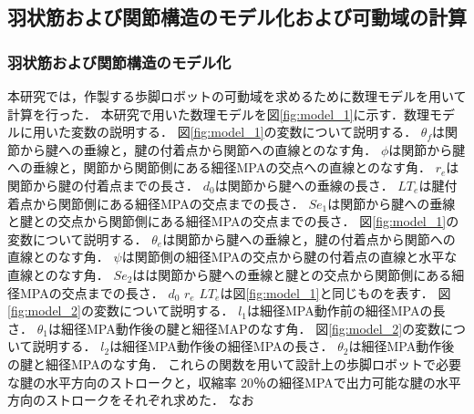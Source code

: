\subsection{羽状筋および関節構造のモデル化および可動域の計算}
\subsubsection{羽状筋および関節構造のモデル化}
本研究では，作製する歩脚ロボットの可動域を求めるために数理モデルを用いて計算を行った．
本研究で用いた数理モデルを図\ref{fig:model_1}に示す．数理モデルに用いた変数の説明する．
図\ref{fig:model_1}の変数について説明する．
$\theta_f $は関節から腱への垂線と，腱の付着点から関節への直線とのなす角．
$\phi $は関節から腱への垂線と，関節から関節側にある細径MPAの交点への直線とのなす角．
$r_e $は関節から腱の付着点までの長さ．
$d_0 $は関節から腱への垂線の長さ．
$LT_e $は腱付着点から関節側にある細径MPAの交点までの長さ．
$Se_1 $は関節から腱への垂線と腱との交点から関節側にある細径MPAの交点までの長さ．
図\ref{fig:model_1}の変数について説明する．
$\theta_e $は関節から腱への垂線と，腱の付着点から関節への直線とのなす角．
$\psi $は関節側の細径MPAの交点から腱の付着点の直線と水平な直線とのなす角．
$Se_2 $はは関節から腱への垂線と腱との交点から関節側にある細径MPAの交点までの長さ．
$d_0$ $r_e$ $LT_e$は図\ref{fig:model_1}と同じものを表す．
図\ref{fig:model_2}の変数について説明する．
$l_1 $は細径MPA動作前の細径MPAの長さ．
$\theta _1 $は細径MPA動作後の腱と細径MAPのなす角．
図\ref{fig:model_2}の変数について説明する．
$l_2 $は細径MPA動作後の細径MPAの長さ．
$\theta_2 $は細径MPA動作後の腱と細径MPAのなす角．
これらの関数を用いて設計上の歩脚ロボットで必要な腱の水平方向のストロークと，収縮率 20％の細径MPAで出力可能な腱の水平方向のストロークをそれぞれ求めた．
なお
